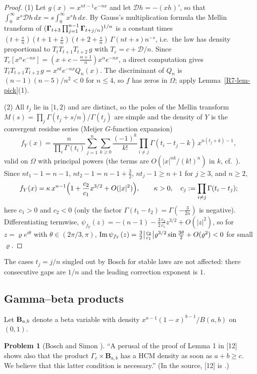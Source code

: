 \documentclass[11pt]{amsart}
\theoremstyle{definition}
\newtheorem{problem}[theorem]{Problem}
\theoremstyle{remark}
\begin{document}
\begin{proof}
(1) Let $g(x)=x^{nt-1}e^{-nx}$ and let $\mathcal D h=-(xh)'$, so that
$\int_0^\infty x^s\mathcal Dh\,dx=s\int_0^\infty x^sh\,dx$. By Gauss's
multiplication formula the Mellin transform of
$(\boldsymbol{\Gamma}_{t+3}\prod_{j=1}^{n-1}\boldsymbol{\Gamma}_{t+j/n})^{1/n}$ is a constant times
$(t+\frac sn)(t+1+\frac sn)(t+2+\frac sn)\,\Gamma(nt+s)n^{-s}$, i.e.\ the law has
density proportional to $T_tT_{t+1}T_{t+2}\,g$ with $T_c=c+\mathcal D/n$.
Since $T_c[x^\alpha e^{-nx}]=(x+c-\frac{\alpha+1}n)x^\alpha e^{-nx}$, a direct
computation gives $T_tT_{t+1}T_{t+2}\,g=x^{nt}e^{-nx}Q_n(x)$. The discriminant
of $Q_n$ is $(n-1)(n-5)/n^2<0$ for $n\le4$, so $f$ has zeros in $\Omega$;
apply Lemma~\ref{R7-lem-pick}(1).

(2) All $t_j$ lie in $[1,2)$ and are distinct, so the poles of the Mellin
transform $M(s)=\prod_j\Gamma(t_j+s/n)/\Gamma(t_j)$ are simple and the density
of $Y$ is the convergent residue series (Meijer $G$-function expansion)
\[
 f_Y(x)=\frac{n}{\prod_i\Gamma(t_i)}\sum_{j=1}^n\sum_{k\ge0}\frac{(-1)^k}{k!}
 \prod_{i\ne j}\Gamma(t_i-t_j-k)\,x^{n(t_j+k)-1},
\]
valid on $\Omega$ with principal powers (the terms are
$O(|x|^{nk}/(k!)^n)$ in $k$, cf.\ \cite[16.17.2]{R7-DLMF}). Since
$nt_1-1=n-1$, $nt_2-1=n-1+\frac32$, $nt_j-1\ge n+1$ for $j\ge3$, and $n\ge2$,
\[
 f_Y(x)=\kappa\,x^{n-1}\Bigl(1+\frac{c_2}{c_1}x^{3/2}+O(|x|^2)\Bigr),\qquad
 \kappa>0,\quad c_j:=\prod_{i\ne j}\Gamma(t_i-t_j);
\]
here $c_1>0$ and $c_2<0$ (only the factor
$\Gamma(t_1-t_2)=\Gamma(-\frac3{2n})$ is negative). Differentiating termwise,
$\psi_{f_Y}(z)=-(n-1)-\frac32\frac{c_2}{c_1}z^{3/2}+O(|z|^2)$, so for
$z=\varrho e^{i\theta}$ with $\theta\in(2\pi/3,\pi)$,
$\operatorname{Im}\psi_{f_Y}(z)=\frac32\bigl|\frac{c_2}{c_1}\bigr|\varrho^{3/2}\sin\frac{3\theta}2+O(\varrho^2)<0$
for small $\varrho$.
\end{proof}

The cases $t_j=j/n$ singled out by Bosch for stable laws are not affected:
there consecutive gaps are $1/n$ and the leading correction exponent is
$1$.

\subsection{Gamma--beta products}
\label{R7-ssec-gammabeta}

Let $\mathbf{B}_{a,b}$ denote a beta variable with density
$x^{a-1}(1-x)^{b-1}/B(a,b)$ on $(0,1)$.

\begin{problem}[{Bosch and Simon \cite[after Lemma~1]{R7-BoschSimon16}}]
\label{R7-prob-BS}
``A perusal of the proof of Lemma 1 in [12] shows also that the product
$\Gamma_c\times\mathbf B_{a,b}$ has a HCM density as soon as $a+b\ge c$. We
believe that this latter condition is necessary.'' (In the source, [12] is
\cite{R7-Simon11}.)
\end{problem}
\end{document}
